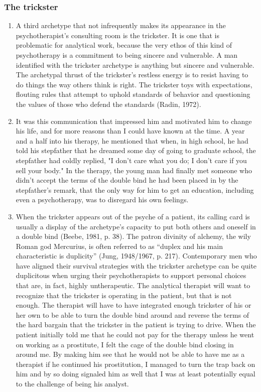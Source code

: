 \subsubsection{The trickster}

\begin{enumerate}

\item {} A third archetype that not infrequently makes its
appearance in the psychotherapist’s consulting room is the trickster. It is one
that is problematic for analytical work, because the very ethos of this kind of
psychotherapy is a commitment to being sincere and vulnerable. A man identified
with the trickster archetype is anything but sincere and vulnerable. The
archetypal thrust of the trickster’s restless energy is to resist having to do
things the way others think is right. The trickster toys with expectations,
flouting rules that attempt to uphold standards of behavior and questioning the
values of those who defend the standards (Radin, 1972).

\item {} It was this communication that impressed
him and motivated him to change his life, and for more reasons than I could
have known at the time. A year and a half into his therapy, he mentioned that
when, in high school, he had told his stepfather that he dreamed some day of
going to graduate school, the stepfather had coldly replied, "I don't care what
you do; I don't care if you sell your body." In the therapy, the young man had
finally met someone who didn't accept the terms of the double bind he had been
placed in by the stepfather's remark, that the only way for him to get an
education, including even a psychotherapy, was to disregard his own feelings.

\item {} When the trickster appears out of the psyche of
a patient, its calling card is usually a display of the archetype’s capacity to
put both others and oneself in a double bind (Beebe, 1981, p. 38). The patron
divinity of alchemy, the wily Roman god Mercurius, is often referred to as
“duplex and his main characteristic is duplicity” (Jung, 1948/1967, p. 217).
Contemporary men who have aligned their survival strategies with the trickster
archetype can be quite duplicitous when urging their psychotherapists to
support personal choices that are, in fact, highly untherapeutic. The
analytical therapist will want to recognize that the trickster is operating in
the patient, but that is not enough. The therapist will have to have integrated
enough trickster of his or her own to be able to turn the double bind around
and reverse the terms of the hard bargain that the trickster in the patient is
trying to drive. When the patient initially told me that he could not pay for
the therapy unless he went on working as a prostitute, I felt the cage of the
double bind closing in around me. By making him see that he would not be able
to have me as a therapist if he continued his prostitution, I managed to turn
the trap back on him and by so doing signaled him as well that I was at least
potentially equal to the challenge of being his analyst.


\end{enumerate}
